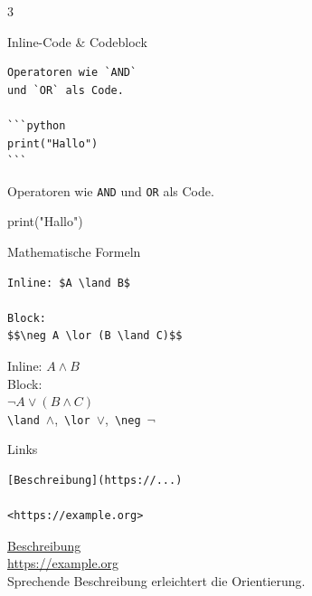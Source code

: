 \documentclass[a4paper,landscape,9pt]{extarticle}
\newcommand{\prevtxt}[1]{{\small #1}}
\begin{document}
\begin{multicols}{3}
\begin{mdcard}{Inline-Code \& Codeblock}
\begin{lstlisting}[language=lia]
Operatoren wie `AND`
und `OR` als Code.

```python
print("Hallo")
```
\end{lstlisting}
\tcblower
\prevtxt{Operatoren wie \texttt{\small AND}
und \texttt{\small OR} als Code.\\[3pt]
\colorbox{codebg}{\parbox{0.85\linewidth}{\ttfamily\scriptsize print("Hallo")}}}
\end{mdcard}

\begin{mdcard}{Mathematische Formeln}
\begin{lstlisting}[language=lia]
Inline: $A \land B$

Block:
$$\neg A \lor (B \land C)$$
\end{lstlisting}
\tcblower
\prevtxt{Inline: $A \land B$\\[3pt]
Block:\\
$\displaystyle \neg A \lor (B \land C)$\\[3pt]
{\scriptsize\color{muted}\texttt{\textbackslash land}~$\land$,\,
\texttt{\textbackslash lor}~$\lor$,\,
\texttt{\textbackslash neg}~$\neg$}}
\end{mdcard}


\begin{mdcard}{Links}
\begin{lstlisting}[language=lia]
[Beschreibung](https://...)

<https://example.org>
\end{lstlisting}
\tcblower
\prevtxt{\textcolor{mdblue}{\underline{Beschreibung}}\\[2pt]
\textcolor{mdblue}{\underline{https://example.org}}\\[3pt]
{\scriptsize\color{muted}Sprechende Beschreibung erleichtert die Orientierung.}}
\end{mdcard}


\end{multicols}
\end{document}
